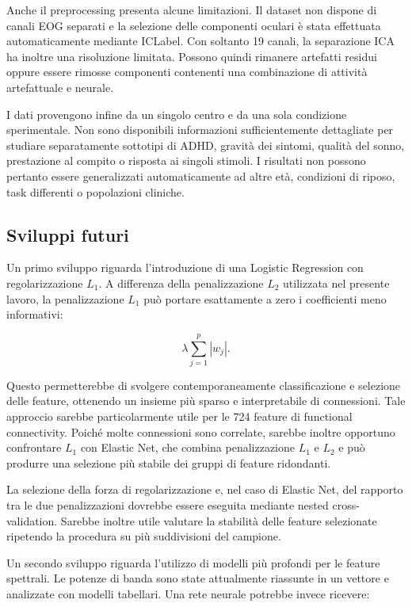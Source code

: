 Anche il preprocessing presenta alcune limitazioni. Il dataset non
dispone di canali EOG separati e la selezione delle componenti
oculari è stata effettuata automaticamente mediante ICLabel.
Con soltanto 19 canali, la separazione ICA ha inoltre una risoluzione
limitata. Possono quindi rimanere artefatti residui oppure essere
rimosse componenti contenenti una combinazione di attività artefattuale
e neurale.

I dati provengono infine da un singolo centro e da una sola condizione
sperimentale. Non sono disponibili informazioni sufficientemente
dettagliate per studiare separatamente sottotipi di ADHD, gravità dei
sintomi, qualità del sonno, prestazione al compito o risposta ai
singoli stimoli. I risultati non possono pertanto essere generalizzati
automaticamente ad altre età, condizioni di riposo, task differenti
o popolazioni cliniche.


\subsection{Sviluppi futuri}

Un primo sviluppo riguarda l'introduzione di una Logistic Regression
con regolarizzazione $L_1$. A differenza della penalizzazione $L_2$
utilizzata nel presente lavoro, la penalizzazione $L_1$ può portare
esattamente a zero i coefficienti meno informativi:

\begin{equation}
	\lambda
	\sum_{j=1}^{p}|w_j|.
\end{equation}

Questo permetterebbe di svolgere contemporaneamente classificazione
e selezione delle feature, ottenendo un insieme più sparso e
interpretabile di connessioni. Tale approccio sarebbe particolarmente
utile per le 724 feature di functional connectivity. Poiché molte
connessioni sono correlate, sarebbe inoltre opportuno confrontare
$L_1$ con Elastic Net, che combina penalizzazione $L_1$ e $L_2$ e
può produrre una selezione più stabile dei gruppi di feature
ridondanti.

La selezione della forza di regolarizzazione e, nel caso di Elastic
Net, del rapporto tra le due penalizzazioni dovrebbe essere eseguita
mediante nested cross-validation. Sarebbe inoltre utile valutare la
stabilità delle feature selezionate ripetendo la procedura su più
suddivisioni del campione.

Un secondo sviluppo riguarda l'utilizzo di modelli più profondi per
le feature spettrali. Le potenze di banda sono state attualmente
riassunte in un vettore e analizzate con modelli tabellari. Una rete
neurale potrebbe invece ricevere:


